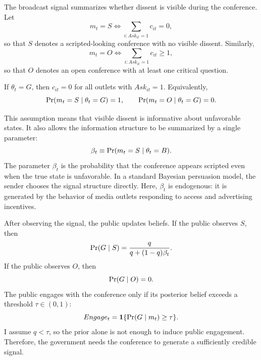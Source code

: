 The broadcast signal summarizes whether dissent is visible during the conference. Let
\begin{equation}
    m_t = S \iff \sum_{i: Ask_{it}=1} c_{it}=0,
\end{equation}
so that $S$ denotes a scripted-looking conference with no visible dissent. Similarly,
\begin{equation}
    m_t = O \iff \sum_{i: Ask_{it}=1} c_{it} \geq 1,
\end{equation}
so that $O$ denotes an open conference with at least one critical question.

\begin{assumption}
If $\theta_t=G$, then $c_{it}=0$ for all outlets with $Ask_{it}=1$. Equivalently,
\begin{equation}
    \Pr(m_t=S \mid \theta_t=G)=1, \qquad \Pr(m_t=O \mid \theta_t=G)=0.
\end{equation}
\end{assumption}

This assumption means that visible dissent is informative about unfavorable states. It also allows the information structure to be summarized by a single parameter:
\begin{equation}
    \beta_t \equiv \Pr(m_t=S \mid \theta_t=B).
\end{equation}
The parameter $\beta_t$ is the probability that the conference appears scripted even when the true state is unfavorable. In a standard Bayesian persuasion model, the sender chooses the signal structure directly. Here, $\beta_t$ is endogenous: it is generated by the behavior of media outlets responding to access and advertising incentives.

After observing the signal, the public updates beliefs. If the public observes $S$, then
\begin{equation}
    \Pr(G \mid S)=\frac{q}{q+(1-q)\beta_t}.
\end{equation}
If the public observes $O$, then
\begin{equation}
    \Pr(G \mid O)=0.
\end{equation}
The public engages with the conference only if its posterior belief exceeds a threshold $\tau \in (0,1)$:
\begin{equation}
    Engage_t = \mathbf{1}\{\Pr(G \mid m_t) \geq \tau\}.
\end{equation}
I assume $q<\tau$, so the prior alone is not enough to induce public engagement. Therefore, the government needs the conference to generate a sufficiently credible signal.

